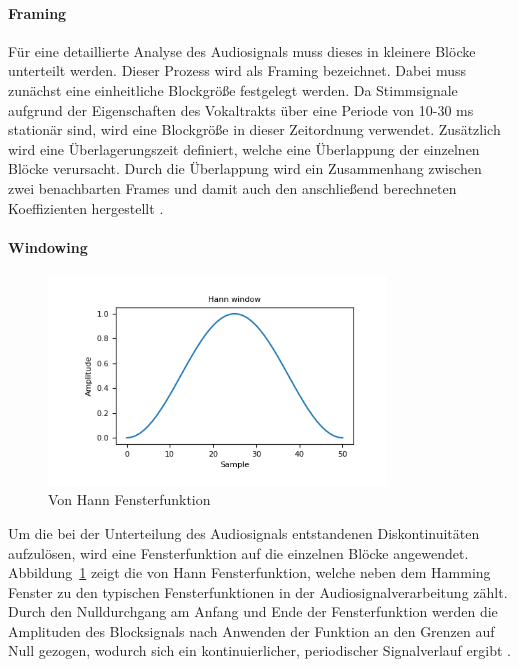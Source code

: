 \paragraph{Framing}\label{sec:Framing}
Für eine detaillierte Analyse des Audiosignals muss dieses in kleinere Blöcke unterteilt werden.
Dieser Prozess wird als Framing bezeichnet.
Dabei muss zunächst eine einheitliche Blockgröße festgelegt werden.
Da Stimmsignale aufgrund der Eigenschaften des Vokaltrakts über eine Periode von 10-30 ms stationär sind, wird eine Blockgröße in dieser Zeitordnung verwendet.
Zusätzlich wird eine Überlagerungszeit definiert, welche eine Überlappung der einzelnen Blöcke verursacht.
Durch die Überlappung wird ein Zusammenhang zwischen zwei benachbarten Frames und damit auch den anschließend berechneten Koeffizienten hergestellt \autocite[vgl.][S. 457]{richter_signal_2022}.

\paragraph{Windowing}
\begin{figure}
  \centering
  \includegraphics[width=0.8\textwidth, keepaspectratio]{images/hann_window.png}
  \caption{Von Hann Fensterfunktion \autocite{noauthor_numpyhanning_nodate}}
  \label{fig:vonHannFenster}
\end{figure}
Um die bei der Unterteilung des Audiosignals entstandenen Diskontinuitäten aufzulösen, wird eine Fensterfunktion auf die einzelnen Blöcke angewendet.
Abbildung~\ref{fig:vonHannFenster} zeigt die von Hann Fensterfunktion, welche neben dem Hamming Fenster zu den typischen Fensterfunktionen in der Audiosignalverarbeitung zählt.
Durch den Nulldurchgang am Anfang und Ende der Fensterfunktion werden die Amplituden des Blocksignals nach Anwenden der Funktion an den Grenzen auf Null gezogen, wodurch sich ein kontinuierlicher, periodischer Signalverlauf ergibt \autocite[vgl.][S. 462]{richter_signal_2022}.

